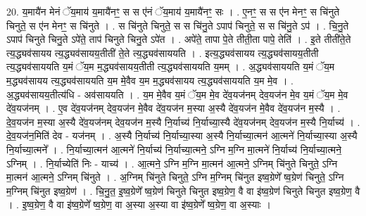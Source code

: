 \documentclass[17pt]{extarticle}
\begin{document}
20. य॒मायै॑न मेनं ॅय॒माय॑ य॒मायै॑नꣳ॒॒ स स ए॑नं ॅय॒माय॑ य॒मायै॑नꣳ॒॒ सः । . ए॒नꣳ॒॒ स स ए॑न मेनꣳ॒॒ स चि॑नुते चिनुते॒ स ए॑न मेनꣳ॒॒ स चि॑नुते । . स चि॑नुते चिनुते॒ स स चि॑नु॒ते ऽपाप॑ चिनुते॒ स स चि॑नु॒ते ऽप॑ । . चि॒नु॒ते ऽपाप॑ चिनुते चिनु॒ते ऽपे॑ते॒ ताप॑ चिनुते चिनु॒ते ऽपे॑त । . अपे॑ते॒ तापा पे॒ते तीती॒ता पापे॒ तेति॑ । . इ॒ते तीती॑ते॒ते त्य॒द्ध्यव॑सायय त्य॒द्ध्यव॑सायय॒तीती॑ ते॒ते त्य॒द्ध्यव॑साययति । . इत्य॒द्ध्यव॑सायय त्य॒द्ध्यव॑सायय॒तीती त्य॒द्ध्यव॑साययति य॒मं ॅय॒म म॒द्ध्यव॑सायय॒तीती त्य॒द्ध्यव॑साययति य॒मम् । . अ॒द्ध्यव॑साययति य॒मं ॅय॒म म॒द्ध्यव॑सायय त्य॒द्ध्यव॑साययति य॒म मे॒वैव य॒म म॒द्ध्यव॑सायय त्य॒द्ध्यव॑साययति य॒म मे॒व । . अ॒द्ध्यव॑सायय॒तीत्य॑धि - अव॑साययति । . य॒म मे॒वैव य॒मं ॅय॒म मे॒व दे॑व॒यज॑नम् देव॒यज॑न मे॒व य॒मं ॅय॒म मे॒व दे॑व॒यज॑नम् । . ए॒व दे॑व॒यज॑नम् देव॒यज॑न मे॒वैव दे॑व॒यज॑न म॒स्या अ॒स्यै दे॑व॒यज॑न मे॒वैव दे॑व॒यज॑न म॒स्यै । . दे॒व॒यज॑न म॒स्या अ॒स्यै दे॑व॒यज॑नम् देव॒यज॑न म॒स्यै नि॒र्याच्य॑ नि॒र्याच्या॒स्यै दे॑व॒यज॑नम् देव॒यज॑न म॒स्यै नि॒र्याच्य॑ । . दे॒व॒यज॑न॒मिति॑ देव - यज॑नम् । . अ॒स्यै नि॒र्याच्य॑ नि॒र्याच्या॒स्या अ॒स्यै नि॒र्याच्या॒त्मन॑ आ॒त्मने॑ नि॒र्याच्या॒स्या अ॒स्यै नि॒र्याच्या॒त्मने᳚ । . नि॒र्याच्या॒त्मन॑ आ॒त्मने॑ नि॒र्याच्य॑ नि॒र्याच्या॒त्मने॒ ऽग्नि म॒ग्नि मा॒त्मने॑ नि॒र्याच्य॑ नि॒र्याच्या॒त्मने॒ ऽग्निम् । . नि॒र्याच्येति॑ निः - याच्य॑ । . आ॒त्मने॒ ऽग्नि म॒ग्नि मा॒त्मन॑ आ॒त्मने॒ ऽग्निम् चि॑नुते चिनुते॒ ऽग्नि मा॒त्मन॑ आ॒त्मने॒ ऽग्निम् चि॑नुते । . अ॒ग्निम् चि॑नुते चिनुते॒ ऽग्नि म॒ग्निम् चि॑नुत इष्व॒ग्रेणे᳚ ष्व॒ग्रेण॑ चिनुते॒ ऽग्नि म॒ग्निम् चि॑नुत इष्व॒ग्रेण॑ । . चि॒नु॒त॒ इ॒ष्व॒ग्रेणे᳚ ष्व॒ग्रेण॑ चिनुते चिनुत इष्व॒ग्रेण॒ वै वा इ॑ष्व॒ग्रेण॑ चिनुते चिनुत इष्व॒ग्रेण॒ वै । . इ॒ष्व॒ग्रेण॒ वै वा इ॑ष्व॒ग्रेणे᳚ ष्व॒ग्रेण॒ वा अ॒स्या अ॒स्या वा इ॑ष्व॒ग्रेणे᳚ ष्व॒ग्रेण॒ वा अ॒स्याः । \newline
\end{document}
